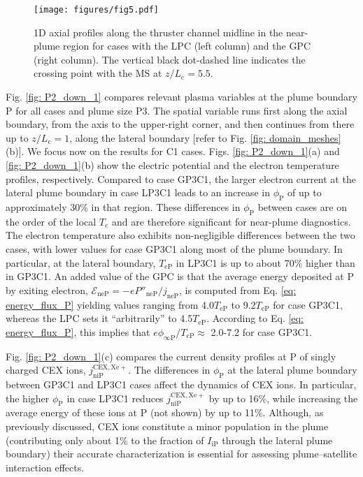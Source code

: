 \documentclass[%
 aip,
cha,
 amsmath,amssymb,
 reprint,%
]{revtex4-1}
\begin{document}
\begin{figure*}[!t]
\centering
\texttt{[image: figures/fig5.pdf]}
\caption{
1D axial profiles along the thruster channel midline in the near-plume region for cases with the LPC (left column) and the GPC (right column). The vertical black dot-dashed line indicates the crossing point with the MS at $z/L_\mathrm{c} = 5.5$.
} 
\label{fig: 1Dz_comp_P1P4}
\end{figure*}

Fig. \ref{fig: P2_down_1} compares relevant plasma variables at the plume boundary P for all cases and plume size P3. The spatial variable runs first along the axial boundary, from the axis to the upper-right corner, and then continues from there up to $z/L_\mathrm{c} = 1$, along the lateral boundary [refer to Fig. \ref{fig: domain_meshes}(b)]. We focus now on the results for C1 cases. 
%
Figs. \ref{fig: P2_down_1}(a) and \ref{fig: P2_down_1}(b) show the electric potential and the electron temperature profiles, respectively.
%
Compared to case GP3C1, the larger electron current at the lateral plume boundary in case LP3C1 leads to an increase in $\phi_\mathrm{P}$ of up to approximately 30\% in that region. These differences in $\phi_\mathrm{P}$ between cases are on the order of the local $T_e$ and are therefore significant for near-plume diagnostics.
%
The electron temperature also exhibits non-negligible differences between the two cases, with lower values for case GP3C1 along most of the plume boundary. In particular, at the lateral boundary, $T_\mathrm{eP}$ in LP3C1 is up to about 70\% higher than in GP3C1.
%
An added value of the GPC is that the average energy deposited at P by exiting electron, $\mathcal{E}_\mathrm{neP} = -eP''_\mathrm{neP}/j_\mathrm{neP}$, is computed from Eq. \eqref{eq: energy_flux_P} yielding values ranging from 4.0$T_\mathrm{eP}$ to 9.2$T_\mathrm{eP}$ for case GP3C1, whereas the LPC sets it ``arbitrarily'' to 4.5$T_\mathrm{eP}$. According to Eq. \eqref{eq: energy_flux_P}, this implies that $e\phi_\mathrm{\infty P}/T_\mathrm{eP} \approx$ 2.0-7.2 for case GP3C1.



Fig. \ref{fig: P2_down_1}(c) compares the current density profiles at P of singly charged CEX ions, $j_\mathrm{niP}^\mathrm{CEX, Xe+}$. The differences in $\phi_\mathrm{P}$ at the lateral plume boundary between GP3C1 and LP3C1 cases affect the dynamics of CEX ions. In particular, the higher $\phi_\mathrm{P}$ in case LP3C1 reduces $j_\mathrm{niP}^\mathrm{CEX, Xe+}$ by up to 16\%, while increasing the average energy of these ions at P (not shown) by up to 11\%.
%
Although, as previously discussed, CEX ions constitute a minor population in the plume (contributing only about 1\% to the fraction of $I_\mathrm{iP}$ through the lateral plume boundary) their accurate characterization is essential for assessing plume–satellite interaction effects.
\end{document}
